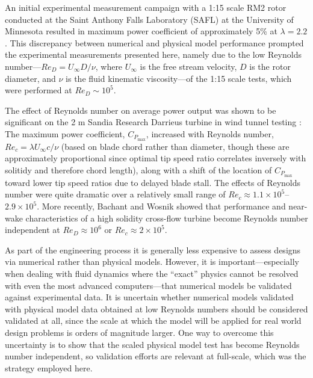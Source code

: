 An initial experimental measurement campaign with a 1:15 scale RM2 rotor
conducted at the Saint Anthony Falls Laboratory (SAFL) at the University of
Minnesota resulted in maximum power coefficient of approximately 5\% at $\lambda
= 2.2$ \cite{Hill2014}. This discrepancy between numerical and physical model
performance prompted the experimental measurements presented here, namely due to
the low Reynolds number---$Re_D = U_\infty D / \nu$, where $U_\infty$ is the
free stream velocity, $D$ is the rotor diameter, and $\nu$ is the fluid
kinematic viscosity---of the 1:15 scale tests, which were performed at $Re_D
\sim 10^5$.

The effect of Reynolds number on average power output was shown to be
significant on the 2 m Sandia Research Darrieus turbine in wind tunnel testing
\cite{Blackwell1976}: The maximum power coefficient, $C_{P_{\max}}$, increased
with Reynolds number, $Re_c=\lambda U_\infty c / \nu$ (based on blade chord
rather than diameter, though these are approximately proportional since optimal
tip speed ratio correlates inversely with solitidy and therefore chord length),
along with a shift of the location of $C_{P_{\max}}$ toward lower tip speed
ratios due to delayed blade stall. The effects of Reynolds number were quite
dramatic over a relatively small range of $Re_c \approx 1.1 \times 10^5$--$2.9
\times 10^5$. More recently, Bachant and Wosnik \cite{Bachant2014,
    Bachant2016-RVAT-Re-dep} showed that performance and near-wake characteristics
of a high solidity cross-flow turbine become Reynolds number independent at
$Re_D \approx 10^6$ or $Re_c \approx 2 \times 10^5$.

As part of the engineering process it is generally less expensive to assess
designs via numerical rather than physical models. However, it is
important---especially when dealing with fluid dynamics where the ``exact''
physics cannot be resolved with even the most advanced computers---that
numerical models be validated against experimental data. It is uncertain whether
numerical models validated with physical model data obtained at low Reynolds
numbers should be considered validated at all, since the scale at which the
model will be applied for real world design problems is orders of magnitude
larger. One way to overcome this uncertainty is to show that the scaled physical
model test has become Reynolds number independent, so validation efforts are
relevant at full-scale, which was the strategy employed here.

